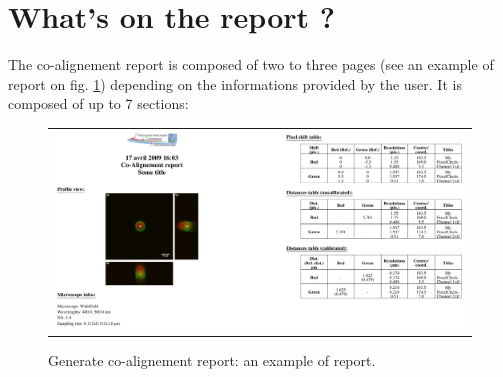 \documentclass[a4paper, 11pt]{report}%
\begin{document}
\section{What's on the report ?}
\label{sec:gcoar-rep}

The co-alignement report is composed of two to three pages (see an example of report on fig. \ref{fig:gcoar-report}) depending on the informations provided by the user. It is composed of up to 7 sections:
\begin{figure}[!ht]
		\begin{center}
		\begin{tabular}{c}
			\includegraphics[width=\linewidth]{img/gcoar-report}
		\end{tabular}
	\end{center}
	\caption{\label{fig:gcoar-report}Generate co-alignement report: an example of report.}
\end{figure} 
\end{document}
